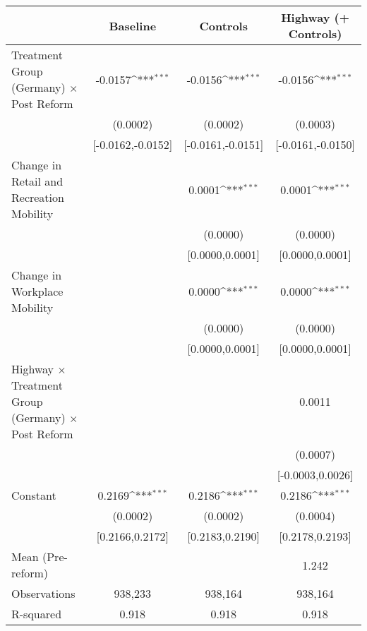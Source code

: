 {
\def\sym#1{\ifmmode^{#1}\else\(^{#1}\)\fi}
\begin{tabular}{l*{3}{c}}
\toprule
                    &\multicolumn{1}{c}{Baseline}&\multicolumn{1}{c}{Controls}&\multicolumn{1}{c}{Highway (+ Controls)}\\
\midrule
Treatment Group (Germany) $\times$ Post Reform&     -0.0157\sym{***}&     -0.0156\sym{***}&     -0.0156\sym{***}\\
                    &    (0.0002)         &    (0.0002)         &    (0.0003)         \\
                    &[-0.0162,-0.0152]         &[-0.0161,-0.0151]         &[-0.0161,-0.0150]         \\
Change in Retail and Recreation Mobility&                     &      0.0001\sym{***}&      0.0001\sym{***}\\
                    &                     &    (0.0000)         &    (0.0000)         \\
                    &                     &[0.0000,0.0001]         &[0.0000,0.0001]         \\
Change in Workplace Mobility&                     &      0.0000\sym{***}&      0.0000\sym{***}\\
                    &                     &    (0.0000)         &    (0.0000)         \\
                    &                     &[0.0000,0.0001]         &[0.0000,0.0001]         \\
Highway $\times$ Treatment Group (Germany) $\times$ Post Reform&                     &                     &      0.0011         \\
                    &                     &                     &    (0.0007)         \\
                    &                     &                     &[-0.0003,0.0026]         \\
Constant            &      0.2169\sym{***}&      0.2186\sym{***}&      0.2186\sym{***}\\
                    &    (0.0002)         &    (0.0002)         &    (0.0004)         \\
                    &[0.2166,0.2172]         &[0.2183,0.2190]         &[0.2178,0.2193]         \\
\midrule
Mean (Pre-reform)   &                     &                     &       1.242         \\
Observations        &     938,233         &     938,164         &     938,164         \\
R-squared           &       0.918         &       0.918         &       0.918         \\
\bottomrule
\end{tabular}
}
